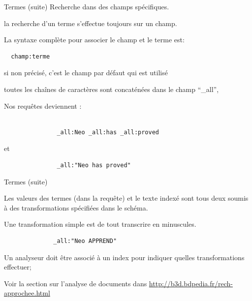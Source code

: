 \begin{frame}[fragile]{Termes (suite)}
Recherche dans des champs spécifiques.
  \begin{redbullet}
    \item la recherche d'un terme s'effectue toujours sur un champ. 
\item La syntaxe complète pour associer le champ et le terme est:
\begin{verbatim}
  champ:terme
\end{verbatim}
\item si non précisé, c'est le champ par défaut qui est utilisé
\item toutes les chaînes de caractères sont concaténées dans
  le champ ``\_all'',
\item Nos requêtes deviennent :
\begin{verbatim}

               _all:Neo _all:has _all:proved
\end{verbatim}
\item et 
\begin{verbatim}
               _all:"Neo has proved"
\end{verbatim}
  \end{redbullet}
\end{frame}

\begin{frame}[fragile]{Termes (suite)}

  \begin{redbullet}
    \item Les valeurs des termes (dans la requête) et le texte indexé sont tous deux
soumis à des transformations spécifiées dans le schéma. 
\item Une transformation simple est de tout transcrire en minuscules. 
\begin{verbatim}
              _all:"Neo APPREND"
\end{verbatim}

\item Un \alert{analyseur} doit être associé à un index
   pour indiquer quelles transformations effectuer;
   
\item  Voir la section sur l'analyse de documents dans \url{http://b3d.bdpedia.fr/rech-approchee.html}
  \end{redbullet}
\end{frame}

